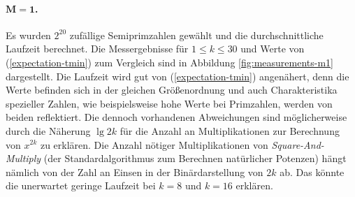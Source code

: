 \documentclass[a4paper, 10pt, ngerman]{article}
\begin{document}
    \paragraph{$\pmb{M = 1}$.} Es wurden $2^{20}$ zufällige Semiprimzahlen gewählt und die durchschnittliche Laufzeit berechnet. Die Messergebnisse für $1 \le k \le 30$ und Werte von (\ref{expectation-tmin}) zum Vergleich sind in Abbildung \ref{fig:measurements-m1} dargestellt. Die Laufzeit wird gut von (\ref{expectation-tmin}) angenähert, denn die Werte befinden sich in der gleichen Größenordnung und auch Charakteristika spezieller Zahlen, wie beispielsweise hohe Werte bei Primzahlen, werden von beiden reflektiert. Die dennoch vorhandenen Abweichungen sind möglicherweise durch die Näherung $\lg 2k$ für die Anzahl an Multiplikationen zur Berechnung von $x^{2k}$ zu erklären. Die Anzahl nötiger Multiplikationen von \emph{Square-And-Multiply} (der Standardalgorithmus zum Berechnen natürlicher Potenzen) hängt nämlich von der Zahl an Einsen in der Binärdarstellung von $2k$ ab. Das könnte die unerwartet geringe Laufzeit bei $k = 8$ und $k = 16$ erklären.
\end{document}
